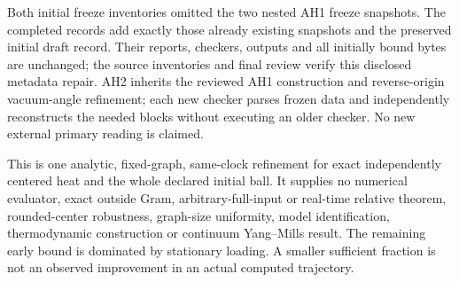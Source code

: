 Both initial freeze inventories omitted the two nested AH1 freeze snapshots. The completed records add exactly those already existing snapshots and the preserved initial draft record. Their reports, checkers, outputs and all initially bound bytes are unchanged; the source inventories and final review verify this disclosed metadata repair. AH2 inherits the reviewed AH1 construction and reverse-origin vacuum-angle refinement; each new checker parses frozen data and independently reconstructs the needed blocks without executing an older checker. No new external primary reading is claimed.

This is one analytic, fixed-graph, same-clock refinement for exact independently centered heat and the whole declared initial ball. It supplies no numerical evaluator, exact outside Gram, arbitrary-full-input or real-time relative theorem, rounded-center robustness, graph-size uniformity, model identification, thermodynamic construction or continuum Yang--Mills result. The remaining early bound is dominated by stationary loading. A smaller sufficient fraction is not an observed improvement in an actual computed trajectory.
